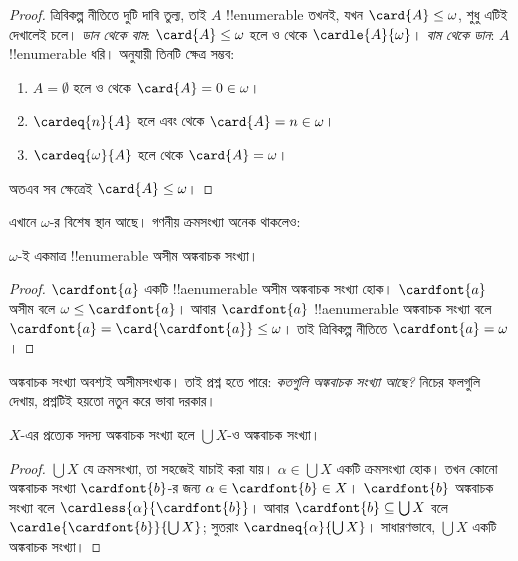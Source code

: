 \documentclass[../../../include/open-logic-section]{subfiles}
\begin{document}
\begin{proof}
ত্রিবিকল্প নীতিতে দুটি দাবি তুল্য, তাই $A$ !!{enumerable}
তখনই, যখন $\card{A}\leq\omega$, শুধু এটিই দেখালেই চলে।
\emph{ডান থেকে বাম}: $\card{A}\leq\omega$ হলে
ও  থেকে $\cardle{A}{\omega}$।
\emph{বাম থেকে ডান}: $A$ !!{enumerable} ধরি।
 অনুযায়ী
তিনটি ক্ষেত্র সম্ভব:
\begin{enumerate}
	\item $A=\emptyset$ হলে
	 ও
	থেকে $\card{A}=0\in\omega$।
	\item $\cardeq{n}{A}$ হলে
	 এবং
	 থেকে
	$\card{A}=n\in\omega$।
	\item $\cardeq{\omega}{A}$ হলে
	 থেকে $\card{A}=\omega$।
\end{enumerate}
অতএব সব ক্ষেত্রেই $\card{A}\leq\omega$।
\end{proof}
\noindent
এখানে $\omega$-র বিশেষ স্থান আছে। গণনীয় ক্রমসংখ্যা
অনেক থাকলেও:

\begin{cor}
$\omega$-ই একমাত্র !!{enumerable} অসীম অঙ্কবাচক সংখ্যা।
\end{cor}

\begin{proof}
$\cardfont{a}$ একটি !!a{enumerable} অসীম অঙ্কবাচক
সংখ্যা হোক। $\cardfont{a}$ অসীম বলে $\omega\leq\cardfont{a}$।
আবার $\cardfont{a}$ !!a{enumerable} অঙ্কবাচক সংখ্যা বলে
$\cardfont{a}=\card{\cardfont{a}}\leq\omega$।
তাই ত্রিবিকল্প নীতিতে $\cardfont{a}=\omega$।
\end{proof}

অঙ্কবাচক সংখ্যা অবশ্যই অসীমসংখ্যক। তাই প্রশ্ন হতে পারে:
\emph{কতগুলি অঙ্কবাচক সংখ্যা আছে?} নিচের ফলগুলি
দেখায়, প্রশ্নটিই হয়তো নতুন করে ভাবা দরকার।

\begin{prop}
$X$-এর প্রত্যেক সদস্য অঙ্কবাচক সংখ্যা হলে
$\bigcup X$-ও অঙ্কবাচক সংখ্যা।
\end{prop}

\begin{proof}
$\bigcup X$ যে ক্রমসংখ্যা, তা সহজেই যাচাই করা যায়।
$\alpha\in\bigcup X$ একটি ক্রমসংখ্যা হোক। তখন কোনো
অঙ্কবাচক সংখ্যা $\cardfont{b}$-র জন্য
$\alpha\in\cardfont{b}\in X$। $\cardfont{b}$ অঙ্কবাচক সংখ্যা
বলে $\cardless{\alpha}{\cardfont{b}}$। আবার
$\cardfont{b}\subseteq\bigcup X$ বলে
$\cardle{\cardfont{b}}{\bigcup X}$; সুতরাং
$\cardneq{\alpha}{\bigcup X}$। সাধারণভাবে,
$\bigcup X$ একটি অঙ্কবাচক সংখ্যা।
\end{proof}
\end{document}
